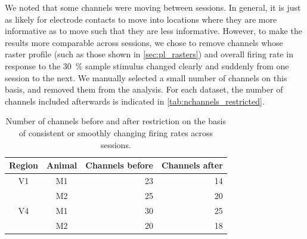 We noted that some channels were moving between sessions.
In general, it is just as likely for electrode contacts to move into locations where they are more informative as to move such that they are less informative.
However, to make the results more comparable across sessions, we chose to remove channels whose raster profile (such as those shown in \autoref{sec:pl_rasters}) and overall firing rate in response to the \SI{30}{\percent} sample stimulus changed clearly and suddenly from one session to the next.
We manually selected a small number of channels on this basis, and removed them from the analysis.
For each dataset, the number of channels included afterwards is indicated in \autoref{tab:nchannels_restricted}.


\begin{table}[bthp]
\begin{center}
\begin{tabular}{ccrr}
\toprule
Region  & Animal    & Channels before   & Channels after \\
\midrule
V1      & M1        & 23                & 14 \\
        & M2        & 25                & 20 \\
V4      & M1        & 30                & 25 \\
        & M2        & 20                & 18 \\
\bottomrule
\end{tabular}
\end{center}
\caption{Number of channels before and after restriction on the basis of consistent or smoothly changing firing rates across sessions.}
\label{tab:nchannels_restricted}
\end{table}


